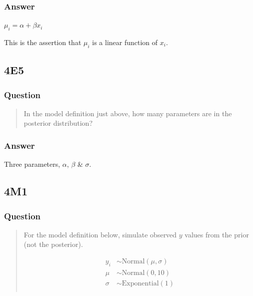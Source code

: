 \documentclass[
]{book}
\begin{document}
\hypertarget{answer-36}{%
\subsubsection*{Answer}\label{answer-36}}

\(\mu_i = \alpha + \beta x_i\)

This is the assertion that \(\mu_i\) is a linear function of \(x_i\).

\hypertarget{e5-1}{%
\subsection*{4E5}\label{e5-1}}

\hypertarget{question-37}{%
\subsubsection*{Question}\label{question-37}}

\begin{quote}
In the model definition just above, how many parameters are in the posterior distribution?
\end{quote}

\hypertarget{answer-37}{%
\subsubsection*{Answer}\label{answer-37}}

Three parameters, \(\alpha\), \(\beta\) \& \(\sigma\).

\hypertarget{m1-2}{%
\subsection*{4M1}\label{m1-2}}

\hypertarget{question-38}{%
\subsubsection*{Question}\label{question-38}}

\begin{quote}
For the model definition below, simulate observed \(y\) values from the prior (not the posterior).

\[
\begin{aligned}
y_i &\sim \text{Normal}(\mu, \sigma) \\
\mu &\sim \text{Normal}(0, 10) \\
\sigma &\sim \text{Exponential}(1) \\
\end{aligned}
\]
\end{quote}
\end{document}
